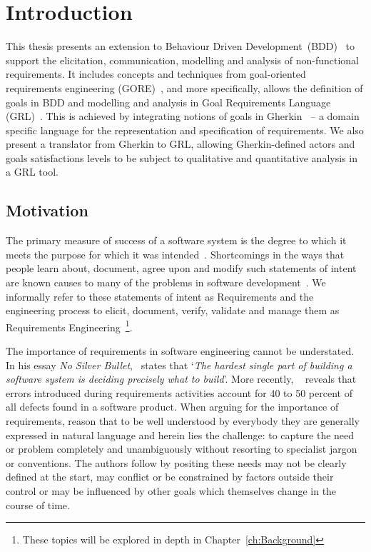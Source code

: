 \documentclass[dissertation]{softeng}
\begin{document}
\clearpage

\pagestyle{plain}
\setcounter{tocdepth}{2}

\tableofcontents

\clearpage

\pagestyle{myheadings}

\chapter{Introduction}
This thesis presents an extension to Behaviour Driven Development~(BDD)~\citep{North2006} to support the elicitation, communication, modelling and analysis of non-functional requirements. It includes concepts and techniques from goal-oriented requirements engineering (GORE)~\citep{Lamsweerde:2001wpba}, and more specifically, allows the definition of goals in BDD and modelling and analysis in Goal Requirements Language (GRL)~\citep{Amyot2010}. This is achieved by integrating notions of goals in Gherkin~\citep{wynne2012cucumber} -- a domain specific language for the representation and specification of requirements. We also present a translator from Gherkin to GRL, allowing Gherkin-defined actors and goals satisfactions levels to be subject to qualitative and quantitative analysis in a GRL tool.

\section{Motivation}
The primary measure of success of a software system is the degree to which it meets the purpose for which it was intended~\citep{Nuseibeh:2000ub}. Shortcomings in the ways that people learn about, document, agree upon and modify such statements of intent are known causes to many of the problems in software development~\citep{Wiegers2013}. We informally refer to these statements of intent as Requirements and the engineering process to elicit, document, verify, validate and manage them as Requirements Engineering~\footnote{These topics will be explored in depth in Chapter~\ref{ch:Background}}.

The importance of requirements in software engineering cannot be understated. In his essay \emph{No Silver Bullet},~\citet{Brooks1987} states that `\emph{The hardest single part of building a software system is deciding precisely what to build}'. More recently, ~\citet{Davis200505} reveals that errors introduced during requirements activities account for 40 to 50 percent of all defects found in a software product.  When arguing for the importance of requirements, \citet{Hull2011} reason that to be well understood by everybody they are generally expressed in natural language and herein lies the challenge: to capture the need or problem completely and unambiguously without resorting to specialist jargon or conventions. The authors follow by positing these needs may not be clearly defined at the start, may conflict or be constrained by factors outside their control or may be influenced by other goals which themselves change in the course of time.
\end{document}
